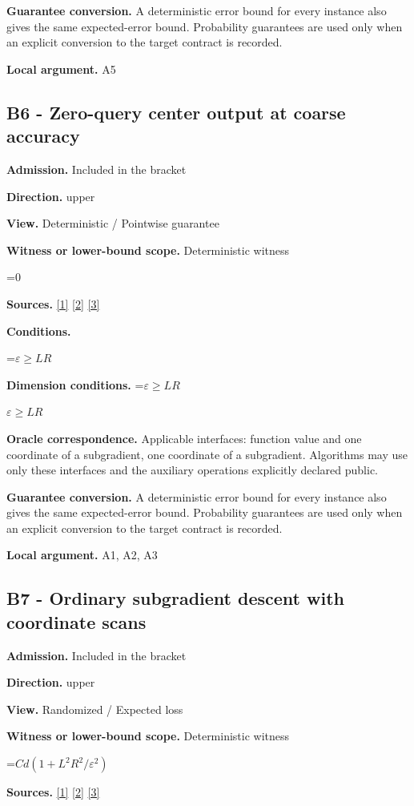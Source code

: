\documentclass[10pt,a4paper]{article}
\newcommand{\AtlasMath}[1]{\par\begingroup\centering\setbox0=\hbox{$\displaystyle #1$}\ifdim\wd0>1.4\linewidth\typeout{ATLAS WIDE FORMULA: \the\wd0}\fi\ifdim\wd0>\linewidth\resizebox{\linewidth}{!}{\box0}\else\box0\fi\par\endgroup}
\newcommand{\AtlasInlineMath}[1]{\begingroup\setbox0=\hbox{$#1$}\ifdim\wd0>.4\linewidth\endgroup\AtlasMath{#1}\else\endgroup$#1$\fi}
\begin{document}
\textbf{Guarantee conversion.} A deterministic error bound for every instance also gives the same expected-error bound. Probability guarantees are used only when an explicit conversion to the target contract is recorded.

\textbf{Local argument.} A5

\subsection{B6 - Zero-query center output at coarse accuracy}
\textbf{Admission.} Included in the bracket

\textbf{Direction.} upper

\textbf{View.} Deterministic / Pointwise guarantee

\textbf{Witness or lower-bound scope.} Deterministic witness

\AtlasMath{0}
\textbf{Sources.} \href{https://arxiv.org/pdf/1405.4980}{[1]} \href{https://www2.isye.gatech.edu/~nemirovs/MOR_AccuracyCertificates.pdf}{[2]} \href{https://arxiv.org/pdf/2609.20701}{[3]}

\textbf{Conditions.} 
\AtlasMath{\varepsilon\ge LR}


\textbf{Dimension conditions.} \AtlasInlineMath{\varepsilon\ge LR}

\textbf{Oracle correspondence.} Applicable interfaces: function value and one coordinate of a subgradient, one coordinate of a subgradient. Algorithms may use only these interfaces and the auxiliary operations explicitly declared public.

\textbf{Guarantee conversion.} A deterministic error bound for every instance also gives the same expected-error bound. Probability guarantees are used only when an explicit conversion to the target contract is recorded.

\textbf{Local argument.} A1, A2, A3

\subsection{B7 - Ordinary subgradient descent with coordinate scans}
\textbf{Admission.} Included in the bracket

\textbf{Direction.} upper

\textbf{View.} Randomized / Expected loss

\textbf{Witness or lower-bound scope.} Deterministic witness

\AtlasMath{Cd(1+L^2R^2/\varepsilon^2)}
\textbf{Sources.} \href{https://arxiv.org/pdf/1405.4980}{[1]} \href{https://www2.isye.gatech.edu/~nemirovs/MOR_AccuracyCertificates.pdf}{[2]} \href{https://arxiv.org/pdf/2609.20701}{[3]}
\end{document}
